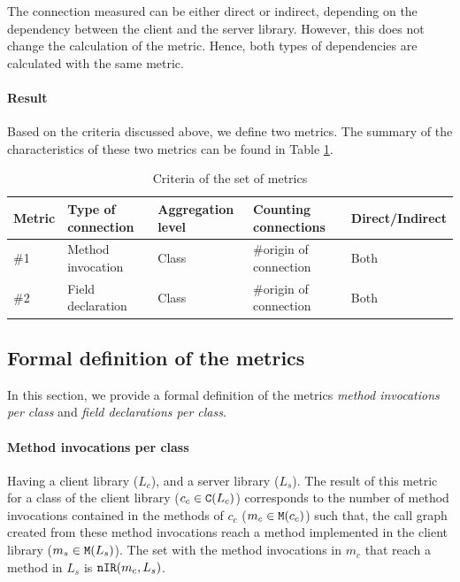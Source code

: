 The connection measured can be either direct or indirect, depending on the dependency between the client and the server library. However, this does not change the calculation of the metric. Hence, both types of dependencies are calculated with the same metric.

\paragraph{Result}
Based on the criteria discussed above, we define two metrics. The summary of the characteristics of these two metrics can be found in Table \ref{table:per-class-characteristics}.

\begin{table}[h]
    \begin{center}
    \begin{tabular}{|l|l|l|l|l|}
    \hline
    Metric & Type of connection & Aggregation level & Counting connections & Direct/Indirect \\ \hline
    \#1 & Method invocation & Class & \#origin of connection & Both \\
    \#2 & Field declaration & Class & \#origin of connection & Both \\
    \hline
    \end{tabular}
    \end{center}
    \caption{Criteria of the set of metrics}
    \label{table:per-class-characteristics}
\end{table}

\subsection{Formal definition of the metrics}
In this section, we provide a formal definition of the metrics \textit{method invocations per class} and \textit{field declarations per class}.

\paragraph{Method invocations per class}
Having a client library ($L_c$), and a server library ($L_s$). The result of this metric for a class of the client library ($c_c \in \verb|C|(L_c)$) corresponds to the number of method invocations contained in the methods of $c_c$ ($m_c \in \verb|M|(c_c)$) such that, the call graph created from these method invocations reach a method implemented in the client library ($m_s \in \verb|M|(L_s)$). The set with the method invocations in $m_c$ that reach a method in $L_s$ is $\verb|nIR|(m_c, L_s)$.

